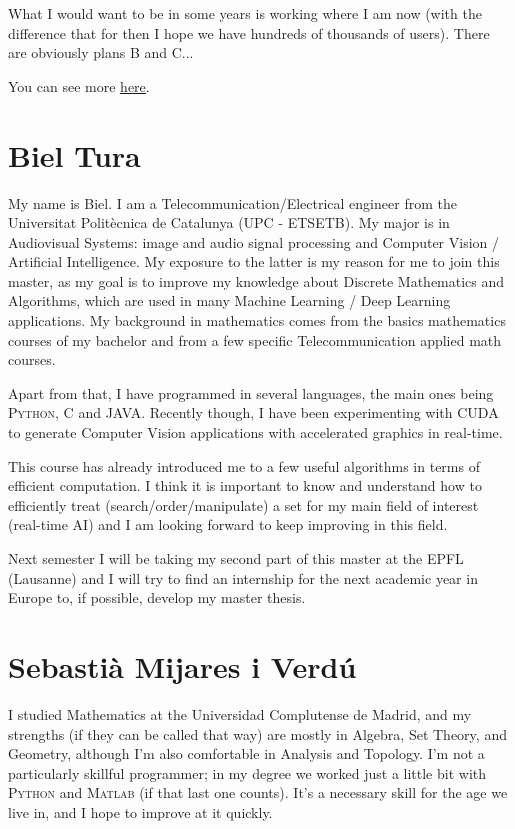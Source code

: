 \documentclass[11pt]{amsart}
\begin{document}
What I would want to be in some years is working where I am now (with the difference that for then I hope we have hundreds of thousands of users). There are obviously plans B and C...

You can see more \href{https://www.linkedin.com/in/victormartinchabrera}{here}.





\medskip

\section*{Biel Tura}
My name is Biel. I am a Telecommunication/Electrical engineer from the Universitat Politècnica de Catalunya (UPC - ETSETB). My major is in Audiovisual Systems: image and audio signal processing and Computer Vision / Artificial Intelligence. My exposure to the latter is my reason for me to join this master, as my goal is to improve my knowledge about Discrete Mathematics and Algorithms, which are used in many Machine Learning / Deep Learning applications. My background in mathematics comes from the basics mathematics courses of my bachelor and from a few specific Telecommunication applied math courses.

Apart from that, I have programmed in several languages, the main ones being \textsc{Python}, \textsc{C} and \textsc{JAVA}. Recently though, I have been experimenting with \textsc{CUDA} to generate Computer Vision applications with accelerated graphics in real-time.

This course has already introduced me to a few useful algorithms in terms of efficient computation. I think it is important to know and understand how to efficiently treat (search/order/manipulate) a set for my main field of interest (real-time AI) and I am looking forward to keep improving in this field.

Next semester I will be taking my second part of this master at the EPFL (Lausanne) and I will try to find an internship for the next academic year in Europe to, if possible, develop my master thesis.


\medskip

\section*{Sebastià Mijares i Verdú}
I studied Mathematics at the Universidad Complutense de Madrid, and my strengths (if they can be called that way) are mostly in Algebra, Set Theory, and Geometry, although I'm also comfortable in Analysis and Topology.
I'm not a particularly skillful programmer; in my degree we worked just a little bit with \textsc{Python} and \textsc{Matlab} (if that last one counts). It's a necessary skill for the age we live in, and I hope to improve
at it quickly.
\end{document}
